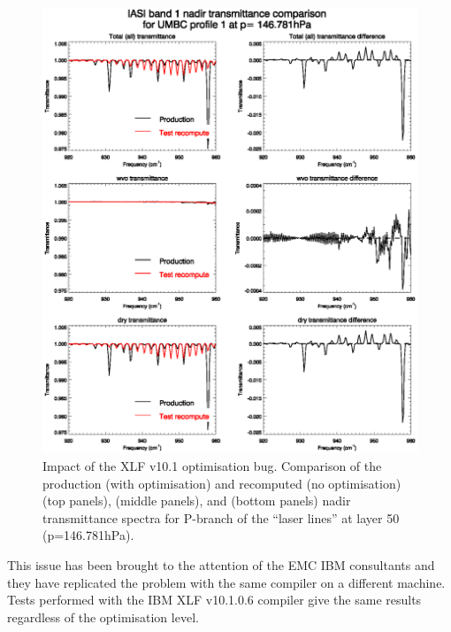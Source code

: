 \begin{figure}[htp]
  \centering
  \includegraphics[scale=0.8]{graphics/lyr50_tauspectra_comparison_920-960cm-1.eps}
  \caption{Impact of the XLF v10.1 optimisation bug. Comparison of the production (with optimisation) and recomputed (no optimisation)  (top panels),  (middle panels), and  (bottom panels) nadir transmittance spectra for P-branch of the  \carbondioxide{} ``laser lines'' at layer 50 (p=146.781hPa).}
  \label{fig:lyr50_tauspectra_comparison_920-960cm-1}
\end{figure}
This issue has been brought to the attention of the EMC IBM consultants and they have replicated the problem with the same compiler on a different machine. Tests performed with the IBM XLF v10.1.0.6 compiler give the same results regardless of the optimisation level.

